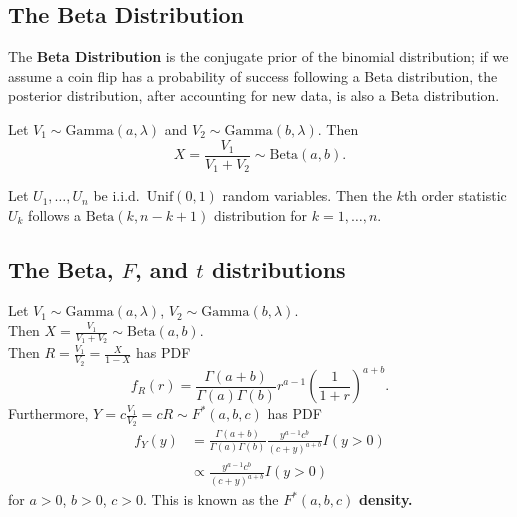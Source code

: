 \begin{enumerate}[a)]
    \subsection{The Beta Distribution}

    \begin{definition}
    The \textbf{Beta Distribution} is the conjugate prior of the binomial distribution; if we assume a coin flip has a probability of success following a
    Beta distribution, the posterior distribution, after accounting for new data, is also a Beta distribution.
    \end{definition}

    \begin{remark}
    Let $V_1 \sim \mathrm{Gamma}(a, \lambda)$ and $V_2 \sim \mathrm{Gamma}(b, \lambda)$. Then
    \[
        X = \frac{V_1}{V_1 + V_2} \sim \mathrm{Beta}(a, b). 
    \]
    \end{remark}

    \begin{remark}
    Let $U_1, \dots, U_n$ be i.i.d.\ $\mathrm{Unif}(0, 1)$ random variables. Then the $k$th order statistic $U_k$ follows a $\mathrm{Beta}(k, n-k + 1)$ distribution for $k = 1, \dots , n$.   
    \end{remark}

    \subsection{The Beta, $F$, and $t$ distributions}
    \begin{definition}
    Let $V_1 \sim \mathrm{Gamma}(a, \lambda)$, $V_2 \sim \mathrm{Gamma}(b, \lambda)$. \\
    
    Then $X = \frac{V_1}{V_1 + V_2} \sim \mathrm{Beta}(a, b)$. \\
    
    Then $R = \frac{V_1}{V_2} = \frac{X}{1-X}$ has PDF
    \[
        f_R(r) = \frac{\Gamma(a + b)}{\Gamma(a)\Gamma(b)} r^{a-1} \left( \frac{1}{1+r} \right)^{a+b}.  
    \]
    Furthermore, $Y = c \frac{V_1}{V_2} = cR \sim F^*(a, b, c)$ has PDF
    \begin{align*}
        f_Y(y) &= \frac{\Gamma(a + b)}{\Gamma(a)\Gamma(b)} \frac{y^{a-1} c^b}{(c+y)^{a+b}} I(y > 0) \\
        &\propto \frac{y^{a-1} c^b}{(c+y)^{a+b}} I(y > 0)
    \end{align*}
    for $a > 0$, $b > 0$, $c > 0$. This is known as the \textbf{$F^* (a, b, c)$}\textbf{ density.}
    \end{definition}


\end{enumerate}
